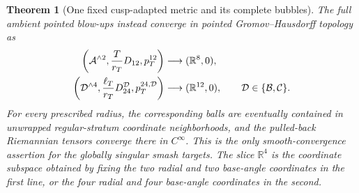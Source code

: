 \documentclass[11pt,letterpaper]{article}
\numberwithin{equation}{section}
\newtheorem{theorem}{Theorem}[section]
\theoremstyle{definition}
\theoremstyle{remark}
\newcommand{\R}{\mathbb R}
\begin{document}
\begin{theorem}[One fixed cusp-adapted metric and its complete bubbles]
The full ambient pointed blow-ups instead converge in pointed
Gromov--Hausdorff topology as
\begin{align}
 \left(\mathcal A^{\wedge2},
       \frac{T}{r_T}D_{12},p_T^{12}\right)
 &\longrightarrow(\R^8,0),\notag\\
 \left(\mathcal D^{\wedge4},
       \frac{\ell_T}{r_T}D_{24}^{\mathcal D},
       p_T^{24,\mathcal D}\right)
 &\longrightarrow(\R^{12},0),
 \qquad \mathcal D\in\{\mathcal B,\mathcal C\}.
 \label{eq:fixed-ambient-bubbles}
\end{align}
For every prescribed radius, the corresponding balls are eventually
contained in unwrapped regular-stratum coordinate neighborhoods, and the
pulled-back Riemannian tensors converge there in \(C^\infty\).  This is the
only smooth-convergence assertion for the globally singular smash targets.
The slice \(\R^4\) is the coordinate
subspace obtained by fixing the two radial and two base-angle coordinates
in the first line, or the four radial and four base-angle coordinates in
the second.
\end{theorem}
\end{document}
